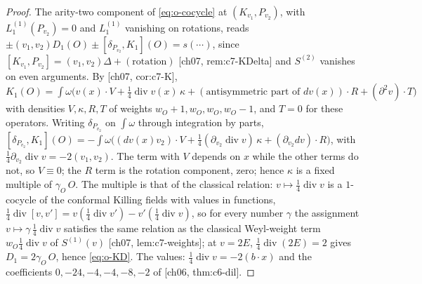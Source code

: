 \begin{proof}
The arity-two component of \eqref{eq:o-cocycle} at $(K_{v_1},P_{v_2})$, with $L_1^{(1)}(P_{v_2})=0$ and $L_1^{(1)}$ vanishing on rotations, reads $\pm(v_1,v_2)D_1(O)\pm[\delta_{P_{v_2}},K_1](O)=s(\cdots)$, since $[K_{v_1},P_{v_2}]=(v_1,v_2)\Delta+(\text{rotation})$ [ch07, rem:c7-KDelta] and $S^{(2)}$ vanishes on even arguments. By [ch07, cor:c7-K], $K_1(O)=\int\omega\big(v(x)\cdot V+\tfrac14\operatorname{div}v(x)\,\kappa+(\text{antisymmetric part of }dv(x))\cdot R+(\partial^2v)\cdot T\big)$ with densities $V,\kappa,R,T$ of weights $w_O+1,w_O,w_O,w_O-1$, and $T=0$ for these operators. Writing $\delta_{P_{v_2}}$ on $\int\omega$ through integration by parts, $[\delta_{P_{v_2}},K_1](O)=-\int\omega\big((dv(x)v_2)\cdot V+\tfrac14(\partial_{v_2}\operatorname{div}v)\,\kappa+(\partial_{v_2}dv)\cdot R\big)$, with $\tfrac14\partial_{v_2}\operatorname{div}v=-2(v_1,v_2)$. The term with $V$ depends on $x$ while the other terms do not, so $V\equiv0$; the $R$ term is the rotation component, zero; hence $\kappa$ is a fixed multiple of $\gamma_O\,O$. The multiple is that of the classical relation: $v\mapsto\tfrac14\operatorname{div}v$ is a $1$-cocycle of the conformal Killing fields with values in functions, $\tfrac14\operatorname{div}[v,v']=v(\tfrac14\operatorname{div}v')-v'(\tfrac14\operatorname{div}v)$, so for every number $\gamma$ the assignment $v\mapsto\gamma\,\tfrac14\operatorname{div}v$ satisfies the same relation as the classical Weyl-weight term $w_O\tfrac14\operatorname{div}v$ of $S^{(1)}(v)$ [ch07, lem:c7-weights]; at $v=2E$, $\tfrac14\operatorname{div}(2E)=2$ gives $D_1=2\gamma_O\,O$, hence \eqref{eq:o-KD}. The values: $\tfrac14\operatorname{div}v=-2(b\cdot x)$ and the coefficients $0,-24,-4,-4,-8,-2$ of [ch06, thm:c6-dil].
\end{proof}

